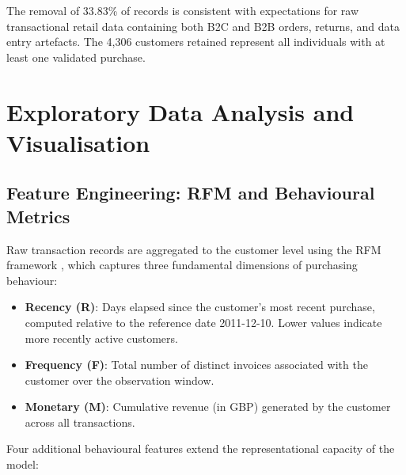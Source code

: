\documentclass[10pt,a4paper]{article}
\begin{document}
The removal of 33.83\% of records is consistent with expectations for raw transactional
retail data containing both B2C and B2B orders, returns, and data entry artefacts.
The 4,306 customers retained represent all individuals with at least one validated purchase.

\section{Exploratory Data Analysis and Visualisation}

\subsection{Feature Engineering: RFM and Behavioural Metrics}

Raw transaction records are aggregated to the customer level using the RFM framework
\parencite{rfm_hughes1994}, which captures three fundamental dimensions of purchasing
behaviour:

\begin{itemize}[leftmargin=*]
  \item \textbf{Recency (R)}: Days elapsed since the customer's most recent purchase,
        computed relative to the reference date 2011-12-10.  Lower values indicate more
        recently active customers.
  \item \textbf{Frequency (F)}: Total number of distinct invoices associated with the
        customer over the observation window.
  \item \textbf{Monetary (M)}: Cumulative revenue (in GBP) generated by the customer
        across all transactions.
\end{itemize}

Four additional behavioural features extend the representational capacity of the model:
\end{document}
